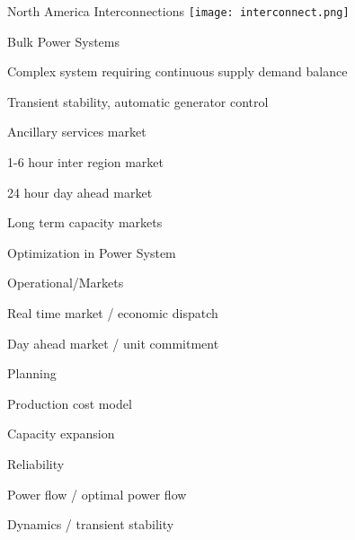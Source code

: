\begin{frame}{North America Interconnections}
\centering
\texttt{[image: interconnect.png]}
\end{frame}

\begin{frame}{Bulk Power Systems}


Complex system requiring continuous supply demand balance

\bi
\item Transient stability, automatic generator control
\item Ancillary services market
\item {}  
\item 1-6 hour inter region market 
\item 24 hour day ahead market
\item Long term capacity markets
\ei
\end{frame}

\begin{frame}{Optimization in Power System}

\bi
\item Operational/Markets
	\bi
	\item Real time market / economic dispatch \only<2>{- \textcolor{red}{LP}}
	\item Day ahead market / unit commitment \only<2>{- \textcolor{red}{MIP}}
	\ei
\item Planning
	\bi
	\item Production cost model
		\only<2>{ \textcolor{red}{simulation - MIP}}
	\item Capacity expansion 
		\only<2>{\textcolor{red}{MIP / DFO}}
	\ei
\item Reliability
	\bi
	\item Power flow / optimal power flow \only<2>{- \textcolor{red}{NLP}}
	\item Dynamics / transient stability \only<2>{\textcolor{red}{simulation - NLP}}
	\ei
\ei



\end{frame}

